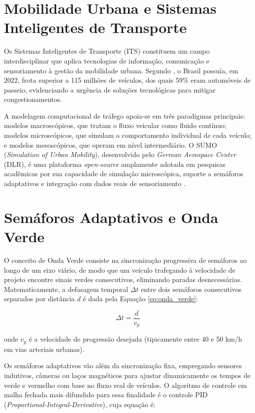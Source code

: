 \documentclass[12pt,a4paper,oneside]{abntex2}
\begin{document}
\section{Mobilidade Urbana e Sistemas Inteligentes de Transporte}

Os Sistemas Inteligentes de Transporte (ITS) constituem um campo interdisciplinar que aplica tecnologias de informação, comunicação e sensoriamento à gestão da mobilidade urbana. Segundo \cite{IBGE2022}, o Brasil possuía, em 2022, frota superior a 115 milhões de veículos, dos quais 59\% eram automóveis de passeio, evidenciando a urgência de soluções tecnológicas para mitigar congestionamentos.

A modelagem computacional de tráfego apoia-se em três paradigmas principais: modelos macroscópicos, que tratam o fluxo veicular como fluido contínuo; modelos microscópicos, que simulam o comportamento individual de cada veículo; e modelos mesoscópicos, que operam em nível intermediário. O SUMO (\textit{Simulation of Urban Mobility}), desenvolvido pelo \textit{German Aerospace Center} (DLR), é uma plataforma \textit{open-source} amplamente adotada em pesquisas acadêmicas por sua capacidade de simulação microscópica, suporte a semáforos adaptativos e integração com dados reais de sensoriamento \cite{SUMO2025}.

\section{Semáforos Adaptativos e Onda Verde}

O conceito de Onda Verde consiste na sincronização progressiva de semáforos ao longo de um eixo viário, de modo que um veículo trafegando à velocidade de projeto encontre sinais verdes consecutivos, eliminando paradas desnecessárias. Matematicamente, a defasagem temporal $\Delta t$ entre dois semáforos consecutivos separados por distância $d$ é dada pela Equação \ref{eq:onda_verde}:

\begin{equation}
\Delta t = \frac{d}{v_p}
\label{eq:onda_verde}
\end{equation}

onde $v_p$ é a velocidade de progressão desejada (tipicamente entre 40 e 50 km/h em vias arteriais urbanas).

Os semáforos adaptativos vão além da sincronização fixa, empregando sensores indutivos, câmeras ou laços magnéticos para ajustar dinamicamente os tempos de verde e vermelho com base no fluxo real de veículos. O algoritmo de controle em malha fechada mais difundido para essa finalidade é o controle PID (\textit{Proportional-Integral-Derivative}), cuja equação é:
\end{document}
